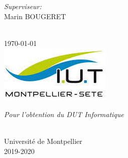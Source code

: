 \documentclass{article}
\begin{document}
\begin{titlepage}
\begin{minipage}{0.4\textwidth}
\end{minipage}
\begin{minipage}{0.4\textwidth}
\begin{flushright} \large
\emph{Superviseur:} \\
Marin \textsc{BOUGERET} %
\end{flushright}
\end{minipage}\\[1cm]


{\large \today}\\[1cm] %
\includegraphics{.ressources/logo.jpeg}%

\begin{minipage}{0.8\textwidth}
\begin{center}
\emph{Pour l'obtention du DUT Informatique} \\
\end{center}
\end{minipage}\\[1cm]

Université de Montpellier \\
2019-2020

\vfill %
\end{titlepage}

\makeatletter
{}
\makeatother

\tableofcontents
\newpage


\end{document}
